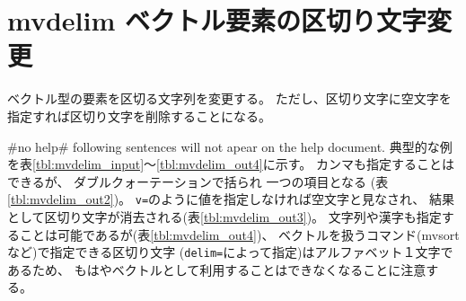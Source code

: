 
%

\section{mvdelim ベクトル要素の区切り文字変更\label{sect:mvdelim}}
ベクトル型の要素を区切る文字列を変更する。
ただし、区切り文字に空文字を指定すれば区切り文字を削除することになる。

 #no help# following sentences will not apear on the help document. \fi
典型的な例を表\ref{tbl:mvdelim_input}〜\ref{tbl:mvdelim_out4}に示す。
カンマも指定することはできるが、
ダブルクォーテーションで括られ 一つの項目となる (表\ref{tbl:mvdelim_out2})。
\verb|v=|のように値を指定しなければ空文字と見なされ、
結果として区切り文字が消去される(表\ref{tbl:mvdelim_out3})。
文字列や漢字も指定することは可能であるが(表\ref{tbl:mvdelim_out4})、
ベクトルを扱うコマンド(mvsortなど)で指定できる区切り文字
(\verb|delim=|によって指定)はアルファベット１文字であるため、
もはやベクトルとして利用することはできなくなることに注意する。

